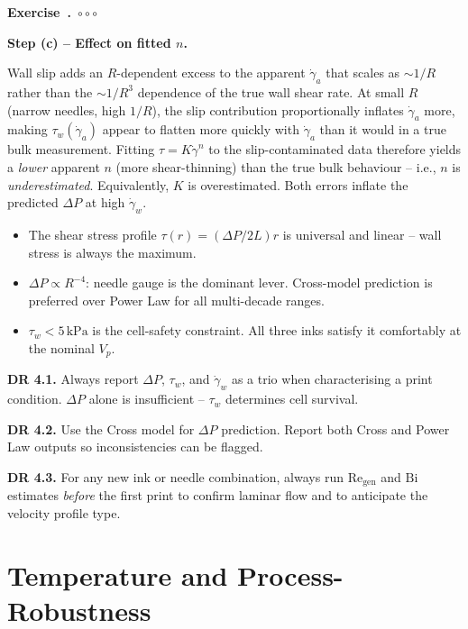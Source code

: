 \documentclass[11pt,a4paper]{article}
\newcommand{\diffC}{\textcolor{red!70!black}{$\circ\circ\circ$}}
\newcounter{exidx}[section]
\renewcommand{\theexidx}{\thesection.\arabic{exidx}}
\newenvironment{exercise}[1]%
  {\par\smallskip\refstepcounter{exidx}%
   \noindent\textbf{Exercise~\theexidx}~#1\quad}
  {\par\smallskip}
\newcommand{\gd}{\dot{\gamma}}
\newcommand{\Bi}{\mathrm{Bi}}
\newcommand{\Rey}{\mathrm{Re}}
\begin{document}
\begin{exercise}{\diffC}
\begin{solution}
\textbf{Step (c) -- Effect on fitted $n$.}

Wall slip adds an $R$-dependent excess to the apparent $\gd_a$ that
scales as $\sim 1/R$ rather than the $\sim 1/R^3$ dependence of the
true wall shear rate. At small $R$ (narrow needles, high $1/R$), the
slip contribution proportionally inflates $\gd_a$ more, making
$\tau_w(\gd_a)$ appear to flatten more quickly with $\gd_a$ than it
would in a true bulk measurement. Fitting $\tau=K\gd^n$ to the
slip-contaminated data therefore yields a \emph{lower} apparent $n$
(more shear-thinning) than the true bulk behaviour -- i.e., $n$ is
\emph{underestimated}. Equivalently, $K$ is overestimated. Both errors
inflate the predicted $\Delta P$ at high $\gd_w$.
\end{solution}
\end{exercise}

\begin{takeawaybox}
\begin{itemize}[leftmargin=1.4em,itemsep=2pt]
\item The shear stress profile $\tau(r)=(\Delta P/2L)r$ is universal and
  linear -- wall stress is always the maximum.
\item $\Delta P\propto R^{-4}$: needle gauge is the dominant lever.
  Cross-model prediction is preferred over Power Law for all
  multi-decade ranges.
\item $\tau_w<5\,\si{\kPa}$ is the cell-safety constraint. All three
  inks satisfy it comfortably at the nominal $V_p$.
\end{itemize}
\end{takeawaybox}

\begin{designrulebox}
\textbf{DR 4.1.} Always report $\Delta P$, $\tau_w$, and $\gd_w$ as a
trio when characterising a print condition. $\Delta P$ alone is
insufficient -- $\tau_w$ determines cell survival.

\textbf{DR 4.2.} Use the Cross model for $\Delta P$ prediction. Report
both Cross and Power Law outputs so inconsistencies can be flagged.

\textbf{DR 4.3.} For any new ink or needle combination, always run
$\Rey_\mathrm{gen}$ and $\Bi$ estimates \emph{before} the first print
to confirm laminar flow and to anticipate the velocity profile type.
\end{designrulebox}

\section{Temperature and Process-Robustness}
\label{sec:temperature}
\end{document}
